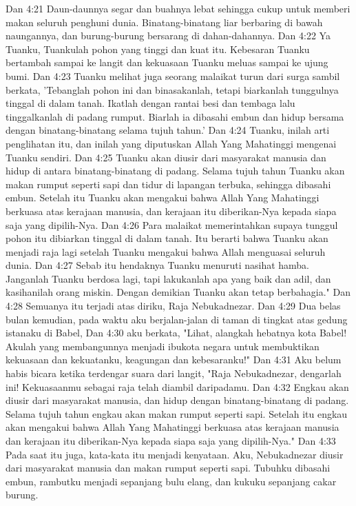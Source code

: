 Dan 4:21  Daun-daunnya segar dan buahnya lebat sehingga cukup untuk memberi makan seluruh penghuni dunia. Binatang-binatang liar berbaring di bawah naungannya, dan burung-burung bersarang di dahan-dahannya.
Dan 4:22  Ya Tuanku, Tuankulah pohon yang tinggi dan kuat itu. Kebesaran Tuanku bertambah sampai ke langit dan kekuasaan Tuanku meluas sampai ke ujung bumi.
Dan 4:23  Tuanku melihat juga seorang malaikat turun dari surga sambil berkata, 'Tebanglah pohon ini dan binasakanlah, tetapi biarkanlah tunggulnya tinggal di dalam tanah. Ikatlah dengan rantai besi dan tembaga lalu tinggalkanlah di padang rumput. Biarlah ia dibasahi embun dan hidup bersama dengan binatang-binatang selama tujuh tahun.'
Dan 4:24  Tuanku, inilah arti penglihatan itu, dan inilah yang diputuskan Allah Yang Mahatinggi mengenai Tuanku sendiri.
Dan 4:25  Tuanku akan diusir dari masyarakat manusia dan hidup di antara binatang-binatang di padang. Selama tujuh tahun Tuanku akan makan rumput seperti sapi dan tidur di lapangan terbuka, sehingga dibasahi embun. Setelah itu Tuanku akan mengakui bahwa Allah Yang Mahatinggi berkuasa atas kerajaan manusia, dan kerajaan itu diberikan-Nya kepada siapa saja yang dipilih-Nya.
Dan 4:26  Para malaikat memerintahkan supaya tunggul pohon itu dibiarkan tinggal di dalam tanah. Itu berarti bahwa Tuanku akan menjadi raja lagi setelah Tuanku mengakui bahwa Allah menguasai seluruh dunia.
Dan 4:27  Sebab itu hendaknya Tuanku menuruti nasihat hamba. Janganlah Tuanku berdosa lagi, tapi lakukanlah apa yang baik dan adil, dan kasihanilah orang miskin. Dengan demikian Tuanku akan tetap berbahagia."
Dan 4:28  Semuanya itu terjadi atas diriku, Raja Nebukadnezar.
Dan 4:29  Dua belas bulan kemudian, pada waktu aku berjalan-jalan di taman di tingkat atas gedung istanaku di Babel,
Dan 4:30  aku berkata, "Lihat, alangkah hebatnya kota Babel! Akulah yang membangunnya menjadi ibukota negara untuk membuktikan kekuasaan dan kekuatanku, keagungan dan kebesaranku!"
Dan 4:31  Aku belum habis bicara ketika terdengar suara dari langit, "Raja Nebukadnezar, dengarlah ini! Kekuasaanmu sebagai raja telah diambil daripadamu.
Dan 4:32  Engkau akan diusir dari masyarakat manusia, dan hidup dengan binatang-binatang di padang. Selama tujuh tahun engkau akan makan rumput seperti sapi. Setelah itu engkau akan mengakui bahwa Allah Yang Mahatinggi berkuasa atas kerajaan manusia dan kerajaan itu diberikan-Nya kepada siapa saja yang dipilih-Nya."
Dan 4:33  Pada saat itu juga, kata-kata itu menjadi kenyataan. Aku, Nebukadnezar diusir dari masyarakat manusia dan makan rumput seperti sapi. Tubuhku dibasahi embun, rambutku menjadi sepanjang bulu elang, dan kukuku sepanjang cakar burung.
